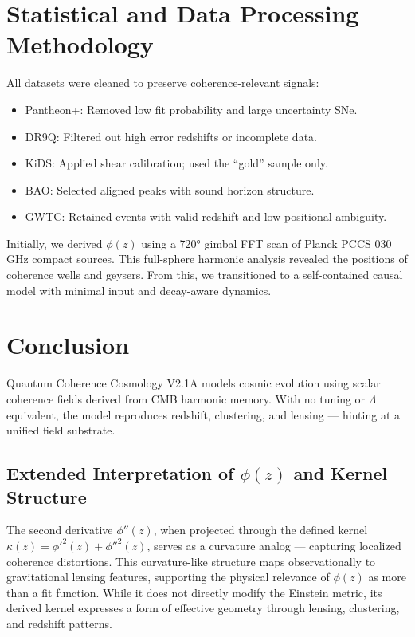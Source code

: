\documentclass[12pt]{article}
\begin{document}
\section{Statistical and Data Processing Methodology}
All datasets were cleaned to preserve coherence-relevant signals:
\begin{itemize}
  \item Pantheon+: Removed low fit probability and large uncertainty SNe.
  \item DR9Q: Filtered out high error redshifts or incomplete data.
  \item KiDS: Applied shear calibration; used the “gold” sample only.
  \item BAO: Selected aligned peaks with sound horizon structure.
  \item GWTC: Retained events with valid redshift and low positional ambiguity.
\end{itemize}

Initially, we derived \( \phi(z) \) using a 720° gimbal FFT scan of Planck PCCS 030 GHz compact sources. This full-sphere harmonic analysis revealed the positions of coherence wells and geysers. From this, we transitioned to a self-contained causal model with minimal input and decay-aware dynamics.

\section{Conclusion}
Quantum Coherence Cosmology V2.1A models cosmic evolution using scalar coherence fields derived from CMB harmonic memory. With no tuning or $\Lambda$ equivalent, the model reproduces redshift, clustering, and lensing — hinting at a unified field substrate.

\appendix
\subsection*{Extended Interpretation of $\phi(z)$ and Kernel Structure}

The second derivative $\phi''(z)$, when projected through the defined kernel $\kappa(z) = \phi'^{2}(z) + \phi''^{2}(z)$, serves as a curvature analog — capturing localized coherence distortions. This curvature-like structure maps observationally to gravitational lensing features, supporting the physical relevance of $\phi(z)$ as more than a fit function. While it does not directly modify the Einstein metric, its derived kernel expresses a form of effective geometry through lensing, clustering, and redshift patterns.
\end{document}
